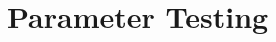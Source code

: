 \documentclass[../../main.tex]{subfiles}
\begin{document}
\section{Parameter Testing}
\end{document}
